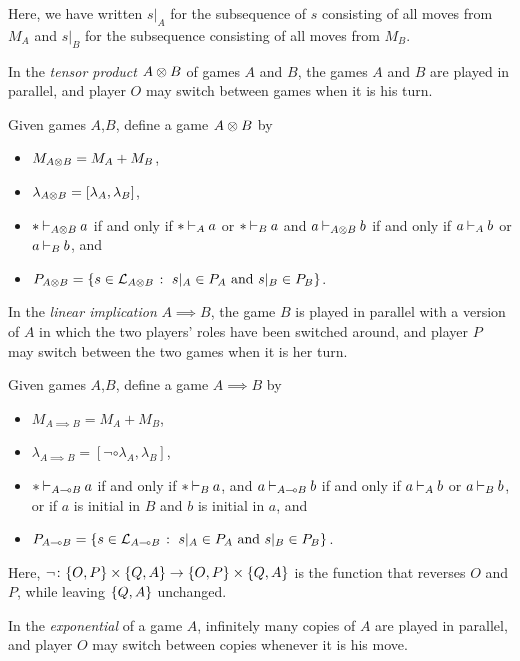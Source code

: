 \documentclass[11pt]{report}
\begin{document}
Here, we have written $s\vert_A$ for the subsequence of $s$ consisting of all moves from $M_A$ and $s\vert_B$ for the subsequence consisting of all moves from $M_B$.

In the \emph{tensor product} $A\otimes B$ of games $A$ and $B$, the games $A$ and $B$ are played in parallel, and player $O$ may switch between games when it is his turn.

\begin{definition}
  Given games $A$,$B$, define a game $A\otimes B$ by
  \begin{itemize}
    \item $M_{A\otimes B} = M_A + M_B$,
    \item $\lambda_{A\otimes B} = [\lambda_A,\lambda_B]$,
    \item $* \mathbin{\vdash}_{A\otimes B} a$ if and only if $*\mathbin{\vdash}_A a$ or $*\mathbin{\vdash}_B a$ and $a \mathbin{\vdash}_{A\otimes B} b$ if and only if $a \mathbin{\vdash}_A b$ or $a\mathbin{\vdash}_B b$, and
    \item $P_{A\otimes B} = \{s\in \mathcal L_{A\otimes B} \;\colon\; \text{$s\vert_A\in P_A$ and $s\vert_B\in P_B$}\}$.
  \end{itemize}
\end{definition}

In the \emph{linear implication} $A\implies B$, the game $B$ is played in parallel with a version of $A$ in which the two players' roles have been switched around, and player $P$ may switch between the two games when it is her turn.

\begin{definition}
  Given games $A$,$B$, define a game $A\implies B$ by
  \begin{itemize}
    \item $M_{A\implies B} = M_A + M_B$,
    \item $\lambda_{A\implies B} = [\neg\circ\lambda_A,\lambda_B]$,
    \item $* \mathbin{\vdash}_{A\multimap B} a$ if and only if $*\mathbin{\vdash}_B a$, and $a \mathbin{\vdash}_{A\multimap B} b$ if and only if $a \mathbin{\vdash}_A b$ or $a\mathbin{\vdash}_B b$, or if $a$ is initial in $B$ and $b$ is initial in $a$, and
    \item $P_{A\multimap B} = \{s\in \mathcal L_{A\multimap B} \;\colon\; \text{$s\vert_A\in P_A$ and $s\vert_B\in P_B$}\}$.
  \end{itemize}
\end{definition}

Here, $\neg\colon \{O,P\}\times\{Q,A\} \to \{O,P\}\times \{Q,A\}$ is the function that reverses $O$ and $P$, while leaving $\{Q,A\}$ unchanged.

In the \emph{exponential} of a game $A$, infinitely many copies of $A$ are played in parallel, and player $O$ may switch between copies whenever it is his move.
\end{document}
